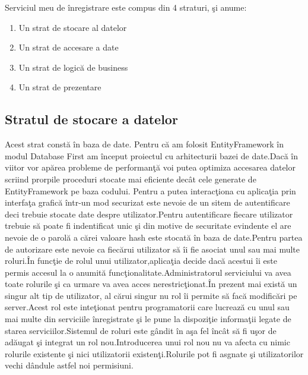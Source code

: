\documentclass[a4paper,12pt]{report}
\begin{document}
Serviciul meu de \^inregistrare este compus din 4 straturi, \c si anume:
\begin{enumerate}
	\item Un strat de stocare al datelor
	\item Un strat de accesare a date
	\item Un strat de logic\u a de business
	\item Un strat de prezentare
\end{enumerate}

\subsection{Stratul de stocare a datelor}

Acest strat const\u a \^in baza de date.
Pentru c\u a am folosit EntityFramework \^in modul Database First am \^inceput proiectul cu arhitecturii
bazei de date.Dac\u a \^in viitor vor ap\u area probleme de performan\c t\u a voi putea optimiza accesarea datelor
scriind prorpile proceduri stocate mai eficiente dec\^at cele generate de EntityFramework pe baza codului.
Pentru a putea interac\c tiona cu aplica\c tia prin interfa\c ta grafic\u a \^intr-un mod securizat este nevoie 
de un sitem de autentificare deci trebuie stocate date despre utilizator.Pentru autentificare fiecare utilizator
trebuie s\u a poate fi indentificat unic \c si din motive de securitate evindente el are nevoie de o parol\u a
a c\u arei valoare hash este stocat\u a \^in baza de date.Pentru partea de autorizare este nevoie ca fiec\u arui 
utilizator s\u a \^ii fie asociat unul sau mai multe roluri.\^In func\c tie de rolul unui utilizator,aplica\c tia decide
dac\u a acestui \^ii este permis accesul la o anumit\u a func\c tionalitate.Administratorul serviciului
va avea toate rolurile \c si ca urmare va avea acces nerestric\c tionat.\^In prezent  mai exist\u a un singur alt tip
de utilizator, al c\u arui singur nu rol \^ii permite s\u a fac\u a modific\u ari pe server.Acest rol este inte\c tionat
pentru programatorii care lucreaz\u a cu unul sau mai multe din serviciile \^inregistrate \c si le pune la dispozi\c tie 
informa\c tii legate de starea serviciilor.Sistemul de roluri este g\^andit \^in a\c sa fel \^inc\^at  s\u a fi u\c sor 
de ad\u augat \c si integrat un rol nou.Introducerea unui rol nou nu va afecta cu nimic rolurile existente \c si nici
utilizatorii existen\c ti.Rolurile pot fi asgnate \c si utilizatorilor vechi d\^andule astfel noi permisiuni.
\end{document}
